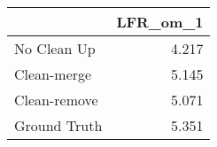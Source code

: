\begin{tabular}{lr}
\toprule
{} & LFR_om_1 \\
\midrule
No Clean Up  &    4.217 \\
Clean-merge  &    5.145 \\
Clean-remove &    5.071 \\
Ground Truth &    5.351 \\
\bottomrule
\end{tabular}
